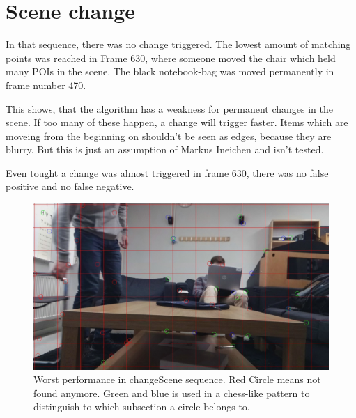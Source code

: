\section{Scene change}
In that sequence, there was no change triggered. The lowest amount of matching points was reached in Frame 630, where someone moved the chair which held many POIs in the scene. The black notebook-bag was moved permanently in frame number 470. 

This shows, that the algorithm has a weakness for permanent changes in the scene. If too many of these happen, a change will trigger faster. Items which are moveing from the beginning on shouldn't be seen as edges, because they are blurry. But this is just an assumption of Markus Ineichen and isn't tested.

Even tought a change was almost triggered in frame 630, there was no false positive and no false negative.


\begin{figure}[h!]
	\centering
	\includegraphics[width=0.9\linewidth]{bin/changeSceneWorst}
	\caption{Worst performance in changeScene sequence. Red Circle means not found anymore. Green and blue is used in a chess-like pattern to distinguish to which subsection a circle belongs to.}
	\label{fig:hotspots}
\end{figure} 




